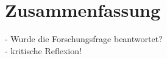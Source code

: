 \section{Zusammenfassung}\label{sec:Zusammenfassung}
- Wurde die Forschungsfrage beantwortet?\\
- kritische Reflexion!\\